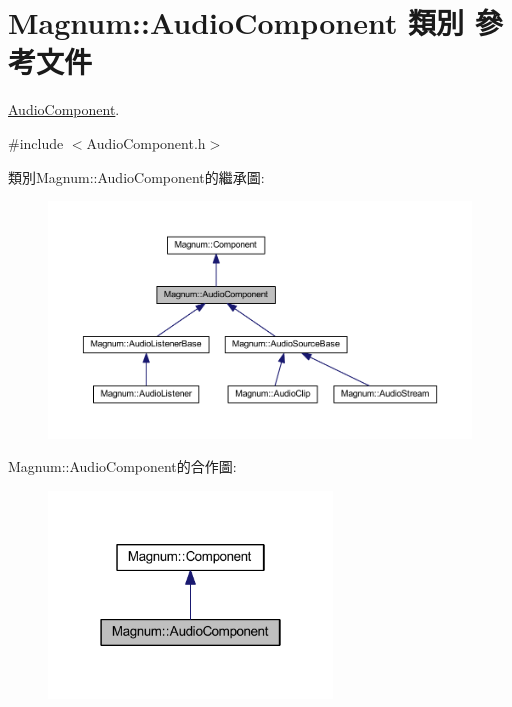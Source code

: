 \hypertarget{class_magnum_1_1_audio_component}{}\section{Magnum\+:\+:Audio\+Component 類別 參考文件}
\label{class_magnum_1_1_audio_component}


\hyperlink{class_magnum_1_1_audio_component}{Audio\+Component}.  




{\ttfamily \#include $<$Audio\+Component.\+h$>$}



類別\+Magnum\+:\+:Audio\+Component的繼承圖\+:\nopagebreak
\begin{figure}[H]
\begin{center}
\leavevmode
\includegraphics[width=350pt]{class_magnum_1_1_audio_component__inherit__graph}
\end{center}
\end{figure}


Magnum\+:\+:Audio\+Component的合作圖\+:\nopagebreak
\begin{figure}[H]
\begin{center}
\leavevmode
\includegraphics[width=214pt]{class_magnum_1_1_audio_component__coll__graph}
\end{center}
\end{figure}
